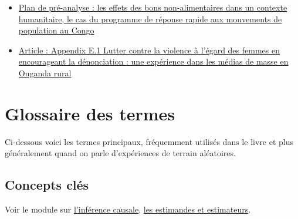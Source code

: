 \documentclass[
  12pt,
]{book}
\begin{document}
\begin{itemize}
\item
  \href{https://osf.io/eutx7/}{Plan de pré-analyse : les effets des bons non-alimentaires dans un contexte humanitaire, le cas du programme de réponse rapide aux mouvements de population au Congo}
\item
  \href{http://jasper-cooper.com/papers/Green_et_al.pdf}{Article : Appendix E.1 Lutter contre la violence à l'égard des femmes en encourageant la dénonciation : une expérience dans les médias de masse en Ouganda rural}
\end{itemize}

\cleardoublepage

\hypertarget{appendix-appendix}{%
\appendix}


\hypertarget{glossaire-des-termes}{%
\chapter{Glossaire des termes}\label{glossaire-des-termes}}

Ci-dessous voici les termes principaux, fréquemment utilisés dans le livre et plus généralement quand on parle d'expériences de terrain aléatoires.

\hypertarget{concepts-cluxe9s}{%
\section{Concepts clés}\label{concepts-cluxe9s}}

Voir le module sur \href{causal-inference.html}{l'inférence causale}, \href{estimands-and-estimators.html}{les estimandes et estimateurs}.
\end{document}
